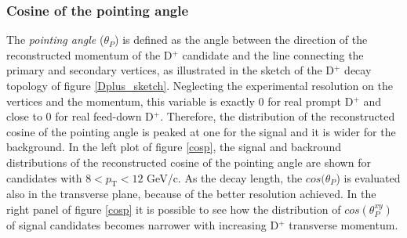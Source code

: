 \documentclass[b5paper,10pt,twoside,oldstyle,classica]{toptesi}
\newcommand{\pt}{p_\text{T}}
\begin{document}
\subsubsection{Cosine of the pointing angle} 
The \textit{pointing angle} ($\theta_P$) is defined as the angle between the direction of the reconstructed momentum of the D$^+$ candidate and the line connecting the primary and secondary vertices, as illustrated in the sketch of the D$^+$ decay topology of figure \ref{Dplus_sketch}. Neglecting the experimental resolution on the vertices and the momentum, this variable is exactly 0 for real prompt D$^+$ and close to 0 for real feed-down D$^+$. Therefore, the distribution of the reconstructed cosine of the pointing angle is peaked at one for the signal and it is wider for the background. In the left plot of figure \ref{cosp}, the signal and backround distributions of the reconstructed cosine of the pointing angle are shown for candidates with $8<\pt<12$ GeV/c. As the decay length, the $cos(\theta_P$) is evaluated also in the transverse plane, because of the better resolution achieved. In the right panel of figure \ref{cosp} it is possible to see how the distribution of $cos(\theta_P^{xy})$ of signal candidates becomes narrower with increasing D$^+$ transverse momentum. 
\end{document}
